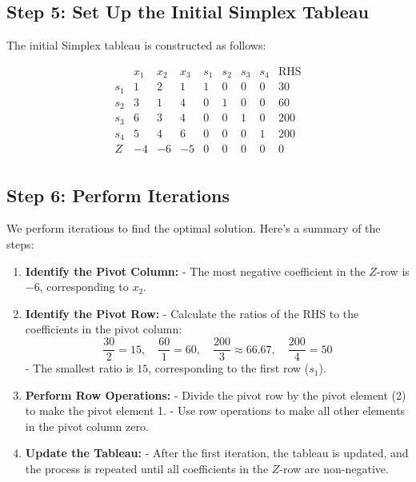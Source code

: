\documentclass{article}
\begin{document}
\subsection*{Step 5: Set Up the Initial Simplex Tableau}
The initial Simplex tableau is constructed as follows:

\[
\begin{array}{cccccccc|c}
 & x_1 & x_2 & x_3 & s_1 & s_2 & s_3 & s_4 & \text{RHS} \\
\hline
s_1 & 1 & 2 & 1 & 1 & 0 & 0 & 0 & 30 \\
s_2 & 3 & 1 & 4 & 0 & 1 & 0 & 0 & 60 \\
s_3 & 6 & 3 & 4 & 0 & 0 & 1 & 0 & 200 \\
s_4 & 5 & 4 & 6 & 0 & 0 & 0 & 1 & 200 \\
\hline
Z & -4 & -6 & -5 & 0 & 0 & 0 & 0 & 0 \\
\end{array}
\]

\subsection*{Step 6: Perform Iterations}
We perform iterations to find the optimal solution. Here’s a summary of the steps:

\begin{enumerate}
    \item \textbf{Identify the Pivot Column:}
    - The most negative coefficient in the \( Z \)-row is \(-6\), corresponding to \( x_2 \).
    
    \item \textbf{Identify the Pivot Row:}
    - Calculate the ratios of the RHS to the coefficients in the pivot column:
    \[
    \frac{30}{2} = 15, \quad \frac{60}{1} = 60, \quad \frac{200}{3} \approx 66.67, \quad \frac{200}{4} = 50
    \]
    - The smallest ratio is \( 15 \), corresponding to the first row (\( s_1 \)).
    
    \item \textbf{Perform Row Operations:}
    - Divide the pivot row by the pivot element (2) to make the pivot element 1.
    - Use row operations to make all other elements in the pivot column zero.
    
    \item \textbf{Update the Tableau:}
    - After the first iteration, the tableau is updated, and the process is repeated until all coefficients in the \( Z \)-row are non-negative.
\end{enumerate}
\end{document}
